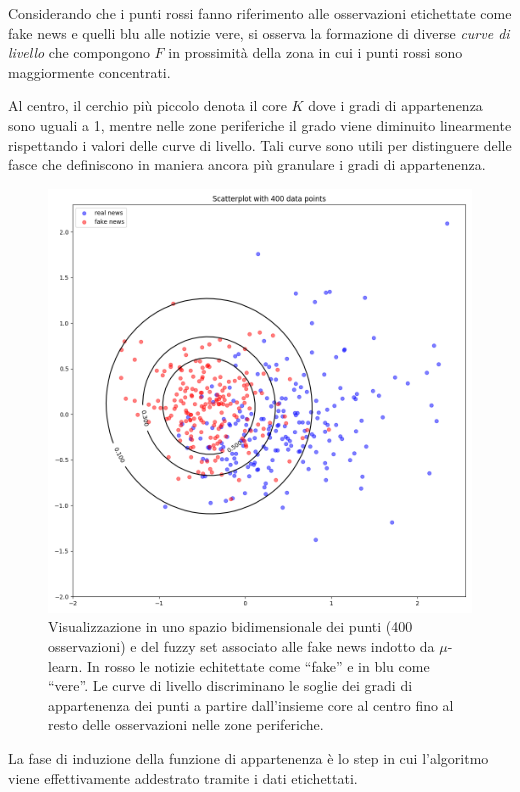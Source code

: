 \documentclass[12pt]{report}
\theoremstyle{definition}
\begin{document}
Considerando che i punti rossi fanno riferimento alle osservazioni etichettate come fake news e quelli blu alle notizie vere, si osserva la formazione di diverse \textit{curve di livello} che compongono $F$ in prossimità della zona in cui i punti rossi sono maggiormente concentrati.

Al centro, il cerchio più piccolo denota il core $K$ dove i gradi di appartenenza sono uguali a 1, mentre nelle zone periferiche il grado viene diminuito linearmente rispettando i valori delle curve di livello. Tali curve sono utili per distinguere delle fasce che definiscono in maniera ancora più granulare i gradi di appartenenza.
\begin{figure}
    \centering
    \includegraphics[scale=0.44]{images/mulearn.png}
    \caption{Visualizzazione in uno spazio bidimensionale dei punti (400 osservazioni) e del fuzzy set associato alle fake news indotto da $\mu$-learn. In rosso le notizie echitettate come ``fake'' e in blu come ``vere''.
    Le curve di livello discriminano le soglie dei gradi di appartenenza dei punti a partire dall'insieme core al centro fino al resto delle osservazioni nelle zone periferiche.}
    \label{mulearnplot}
\end{figure}
La fase di induzione della funzione di appartenenza è lo step in cui l'algoritmo viene effettivamente addestrato tramite i dati etichettati.
\end{document}
